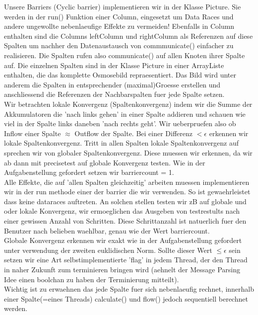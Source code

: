 \documentclass[12pt]{article}
\begin{document}
Unsere Barriers (Cyclic barrier) implementieren wir in der Klasse Picture. Sie werden in der run() Funktion einer Column, eingesetzt um Data Races und andere ungewollte nebenlaeufige Effekte zu vermeiden! Ebenfalls in Column enthalten sind die Columns leftColumn und rightColumn als Referenzen auf diese Spalten um nachher den Datenaustausch von commmunicate() einfacher zu realisieren. Die Spalten rufen also communicate() auf allen Knoten ihrer Spalte auf. Die einzelnen Spalten sind in der Klasse Picture in einer ArrayListe enthalten, die das komplette Osmosebild repraesentiert. Das Bild wird unter anderem die Spalten in entsprechender (maximal)Groesse erstellen und anschliessend die Referenzen der Nachbarspalten fuer jede Spalte setzen.\\
Wir betrachten lokale Konvergenz (Spaltenkonvergenz) indem wir die Summe der Akkumulatoren die 'nach links gehen' in einer Spalte addieren und schauen wie viel in der Spalte links daneben 'nach rechts geht'. Wir ueberpruefen also ob Inflow einer Spalte $\approx$ Outflow der Spalte. Bei einer Differenz $< \epsilon$ erkennen wir lokale Spaltenkonvergenz. Tritt in allen Spalten lokale Spaltenkonvergenz auf sprechen wir von globaler Spaltenkonvergenz. Diese muessen wir erkennen, da wir ab dann mit precisetest auf globale Konvergenz testen. Wie in der Aufgabenstellung gefordert setzen wir barriercount = 1.\\
Alle Effekte, die auf 'allen Spalten gleichzeitig' arbeiten muessen implementieren wir in der run methode einer der barrier die wir verwenden. So ist gewaehrleistet dass keine dataraces auftreten. An solchen stellen testen wir zB auf globale und oder lokale Konvergenz, wir ermoeglichen das Ausgeben von testrestults nach einer gewissen Anzahl von Schritten. Diese Schrittanzahl ist natuerlich fuer den Benutzer nach belieben waehlbar, genau wie der Wert barriercount. \\
Globale Konvergenz erkennen wir exakt wie in der Aufgabenstellung gefordert unter verwendung der zweiten euklidischen Norm. Sollte dieser Wert $\leq \epsilon$ sein setzen wir eine Art selbstimplementierte 'flag' in jedem Thread, der den Thread in naher Zukunft zum terminieren bringen wird (aehnelt der Message Parsing Idee einen boolchan zu haben der Terminierung mitteilt).\\

Wichtig ist zu erwaehnen das jede Spalte fuer sich nebenlaeufig rechnet, innerhalb einer Spalte(=eines Threads) calculate() und flow() jedoch sequentiell berechnet werden.\\
\end{document}

